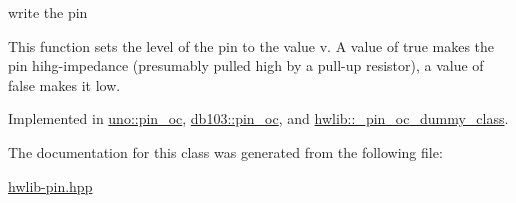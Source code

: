 write the pin 

This function sets the level of the pin to the value v. A value of true makes the pin hihg-\/impedance (presumably pulled high by a pull-\/up resistor), a value of false makes it low. 

Implemented in \hyperlink{classuno_1_1pin__oc_a4f3191e577d13dab583d5fe86a9d960e}{uno\+::pin\+\_\+oc}, \hyperlink{classdb103_1_1pin__oc_afce9e329b087308a33ae30dbd701b08a}{db103\+::pin\+\_\+oc}, and \hyperlink{classhwlib_1_1__pin__oc__dummy__class_a10db7f81b4ed0dc0573f039d97c1d69e}{hwlib\+::\+\_\+pin\+\_\+oc\+\_\+dummy\+\_\+class}.



The documentation for this class was generated from the following file\+:\begin{DoxyCompactItemize}
\item 
\hyperlink{hwlib-pin_8hpp}{hwlib-\/pin.\+hpp}\end{DoxyCompactItemize}
